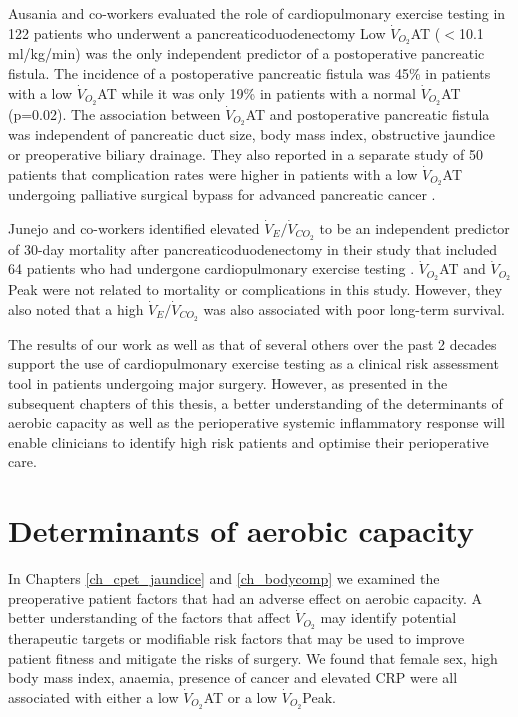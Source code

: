 Ausania and co-workers evaluated the role of cardiopulmonary exercise testing in 122 patients who underwent a pancreaticoduodenectomy \parencite{ausania_effects_2012}
Low $\dot{V}_{O_2}$AT ($<$10.1 ml/kg/min) was the only independent predictor of a postoperative pancreatic fistula.
The incidence of a postoperative pancreatic fistula was 45\% in patients with a low $\dot{V}_{O_2}$AT while it was only 19\% in patients with a normal $\dot{V}_{O_2}$AT (p=0.02).
The association between $\dot{V}_{O_2}$AT and postoperative pancreatic fistula was independent of pancreatic duct size, body mass index, obstructive jaundice or preoperative biliary drainage.
They also reported in a separate study of 50 patients that complication  rates were higher in patients with a low $\dot{V}_{O_2}$AT undergoing palliative surgical bypass for advanced pancreatic cancer \parencite{ausania_double_2012}.

Junejo and co-workers identified elevated $\dot{V}_E/\dot{V}_{CO_2}$ to be an independent predictor of 30-day mortality after pancreaticoduodenectomy in their study that included 64 patients who had undergone cardiopulmonary exercise testing \parencite{junejo_cardiopulmonary_2014}.
$\dot{V}_{O_2}$AT and $\dot{V}_{O_2}$Peak  were not related to mortality or complications in this study.
However, they also noted that a high $\dot{V}_E/\dot{V}_{CO_2}$ was also associated with poor long-term survival.

The results of our work as well as that of several others over the past 2 decades support the use of cardiopulmonary exercise testing as a clinical risk assessment tool in patients undergoing major surgery.
However, as presented in the subsequent chapters of this thesis, a better understanding of the determinants of aerobic capacity as well as the perioperative systemic inflammatory response will enable clinicians to identify high risk patients and optimise their perioperative care.

\section{Determinants of aerobic capacity}
In Chapters \ref{ch_cpet_jaundice} and \ref{ch_bodycomp} we examined the preoperative patient factors that had an adverse effect on aerobic capacity.
A better understanding of the factors that affect $\dot{V}_{O_2}$ may identify potential therapeutic targets or modifiable risk factors that may be used to improve patient fitness and mitigate the risks of surgery.
We found that female sex, high body mass index, anaemia, presence of cancer and elevated CRP were all associated with either a low $\dot{V}_{O_2}$AT or a low $\dot{V}_{O_2}$Peak.


